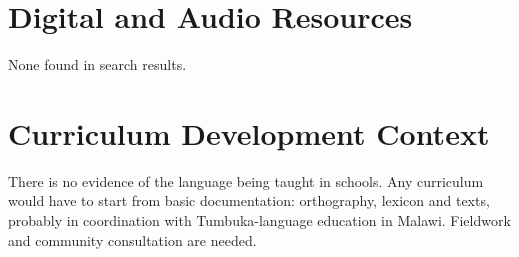 \documentclass[12pt]{article}
\begin{document}
\section{Digital and Audio Resources}
None found in search results.

\section{Curriculum Development Context}
There is no evidence of the language being taught in schools. Any curriculum would have to start from basic documentation: orthography, lexicon and texts, probably in coordination with Tumbuka-language education in Malawi. Fieldwork and community consultation are needed.
\end{document}
